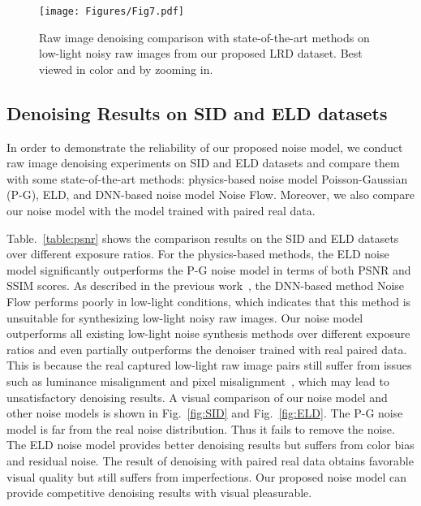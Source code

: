 \documentclass[10pt,twocolumn,letterpaper]{article}
\begin{document}
\begin{figure*}
\begin{center}
\texttt{[image: Figures/Fig7.pdf]}
\caption{Raw image denoising comparison with state-of-the-art methods on low-light noisy raw images from our proposed LRD dataset. Best viewed in color and by zooming in.}
\label{fig:LRD}
\end{center}
\vspace{-3ex}
\end{figure*}

\vspace{-0.5em}
\subsection{Denoising Results on SID and ELD datasets}
\vspace{-0.5em}
In order to demonstrate the reliability of our proposed noise model, we conduct raw image denoising experiments on SID and ELD datasets and compare them with some state-of-the-art methods: physics-based noise model Poisson-Gaussian (P-G), ELD, and DNN-based noise model Noise Flow. Moreover, we also compare our noise model with the model trained with paired real data.

Table.~\ref{table:psnr} shows the comparison results on the SID and ELD datasets over different exposure ratios. For the physics-based methods, the ELD noise model significantly outperforms the P-G noise model in terms of both PSNR and SSIM scores. As described in the previous work~\cite{zhang2021rethinking}, the DNN-based method Noise Flow performs poorly in low-light conditions, which indicates that this method is unsuitable for synthesizing low-light noisy raw images. Our noise model outperforms all existing low-light noise synthesis methods over different exposure ratios and even partially outperforms the denoiser trained with real paired data. This is because the real captured low-light raw image pairs still suffer from issues such as luminance misalignment and pixel misalignment~\cite{lehtinen2018noise2noise}, which may lead to unsatisfactory denoising results. A visual comparison of our noise model and other noise models is shown in Fig.~\ref{fig:SID} and Fig.~\ref{fig:ELD}. The P-G noise model is far from the real noise distribution. Thus it fails to remove the noise. The ELD noise model provides better denoising results but suffers from color bias and residual noise. The result of denoising with paired real data obtains favorable visual quality but still suffers from imperfections. Our proposed noise model can provide competitive denoising results with visual pleasurable.
\end{document}

